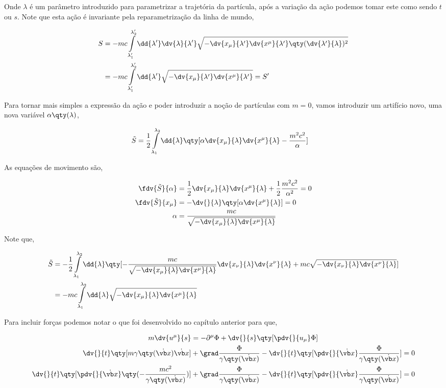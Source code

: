 \documentclass[twoside]{amsart}
\numberwithin{equation}{section}
\begin{document}
\begin{refsection}
Onde $\lambda$ é um parâmetro introduzido para parametrizar a trajetória da partícula, após a variação da ação podemos tomar este como sendo $t$ ou $s$. Note que esta ação é invariante pela reparametrização da linha de mundo,

\begin{align}
    S&=-mc\int\limits_{\lambda_1'}^{\lambda_2'}\dd{\lambda'}\dv{\lambda}{\lambda'}\sqrt{-\dv{x_\mu}{\lambda'}\dv{x^\mu}{\lambda'}\qty(\dv{\lambda'}{\lambda})^2}\\
    &=-mc\int\limits_{\lambda_1'}^{\lambda_2'}\dd{\lambda'}\sqrt{-\dv{x_\mu}{\lambda'}\dv{x^\mu}{\lambda'}}=S'
\end{align}

Para tornar mais simples a expressão da ação e poder introduzir a noção de partículas com $m=0$, vamos introduzir um artifício novo, uma nova variável $\alpha\qty(\lambda)$,

\begin{align}
    \tilde S&=\frac12\int\limits_{\lambda_1}^{\lambda_2}\dd{\lambda}\qty[\alpha\dv{x_\mu}{\lambda}\dv{x^\mu}{\lambda}-\frac{m^2c^2}{\alpha}]
\end{align}

As equações de movimento são,

\begin{align}
    \fdv{\tilde S}{\alpha}&=\frac12\dv{x_\mu}{\lambda}\dv{x^\mu}{\lambda}+\frac12 \frac{m^2c^2}{\alpha^2}=0\\
    \fdv{\tilde S}{x_\mu}&=-\dv{}{\lambda}\qty[\alpha\dv{x^\mu}{\lambda}]=0\\
    \alpha&=\frac{mc}{\sqrt{-\dv{x_\mu}{\lambda}\dv{x^\mu}{\lambda}}}
\end{align}

Note que,

\begin{align}
    \tilde S&=-\frac12\int\limits_{\lambda_1}^{\lambda_2}\dd{\lambda}\qty[-\frac{mc}{\sqrt{-\dv{x_\mu}{\lambda}\dv{x^\mu}{\lambda}}}\dv{x_\nu}{\lambda}\dv{x^\nu}{\lambda}+mc\sqrt{-\dv{x_\nu}{\lambda}\dv{x^\nu}{\lambda}}]\\
    &=-mc\int\limits_{\lambda_1}^{\lambda_2}\dd{\lambda}\sqrt{-\dv{x_\mu}{\lambda}\dv{x^\mu}{\lambda}}
\end{align}

Para incluir forças podemos notar o que foi desenvolvido no capítulo anterior para que,

\begin{align}
    m\dv{u^\mu}{s}&=-\partial^\mu\Phi+\dv{}{s}\qty[\pdv{}{u_\mu}\Phi]\\
    \dv{}{t}\qty[m\gamma\qty(\dot{\vb x})\dot{\vb x}]&+\grad\frac{\Phi}{\gamma\qty(\dot{\vb x})}-\dv{}{t}\qty[\pdv{}{\dot{\vb x}}\frac{\Phi}{\gamma\qty(\dot{\vb x})}]=0\\
    \dv{}{t}\qty[\pdv{}{\dot{\vb x}}\qty(-\frac{mc^2}{\gamma\qty(\dot{\vb x})})]&+\grad\frac{\Phi}{\gamma\qty(\dot{\vb x})}-\dv{}{t}\qty[\pdv{}{\dot{\vb x}}\frac{\Phi}{\gamma\qty(\dot{\vb x})}]=0
\end{align}


\end{refsection}
\end{document}
